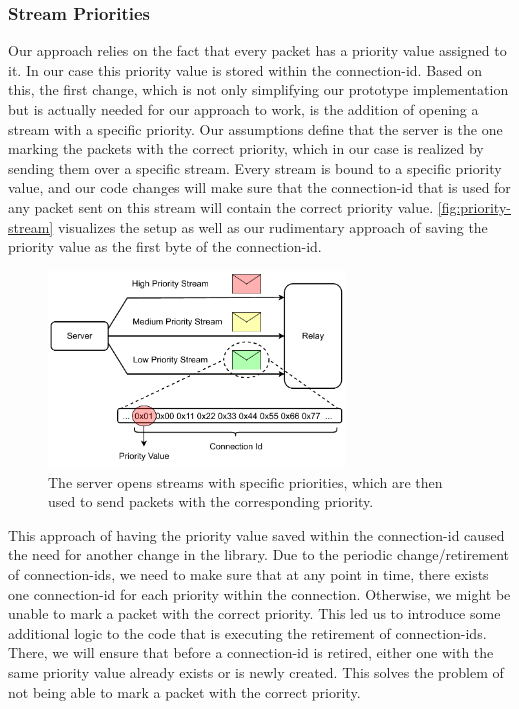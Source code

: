 \subsubsection*{Stream Priorities}
Our approach relies on the fact that every packet has a priority value assigned to it.
In our case this priority value is stored within the connection-id.
Based on this, the first change, which is not only simplifying our prototype implementation but is actually needed for 
our approach to work, is the addition of opening a stream with a specific priority.
Our assumptions define that the server is the one marking the packets with the correct priority, which in 
our case is realized by sending them over a specific stream.
Every stream is bound to a specific priority value, and our code changes will make sure that the connection-id
that is used for any packet sent on this stream will contain the correct priority value.
\autoref{fig:priority-stream} visualizes the setup as well as our rudimentary approach of saving the 
priority value as the first byte of the connection-id.

\vspace{0.5cm}
\begin{figure}[H]
    \centering
    \includegraphics[width=0.7\textwidth]{figures/03_fast_relays/priority-streams.drawio.pdf}
    \caption[Streams with specific priorities]{The server opens streams with specific priorities, 
    which are then used to send packets with the corresponding priority.}\label{fig:priority-stream}
\end{figure}

This approach of having the priority value saved within the connection-id caused the need for another 
change in the library.
Due to the periodic change/retirement of connection-ids, we need to make sure that at any point in time, there 
exists one connection-id for each priority within the connection.
Otherwise, we might be unable to mark a packet with the correct priority.
This led us to introduce some additional logic to the code that is executing the retirement of connection-ids.
There, we will ensure that before a connection-id is retired, either one with the same priority value
already exists or is newly created.
This solves the problem of not being able to mark a packet with the correct priority.

